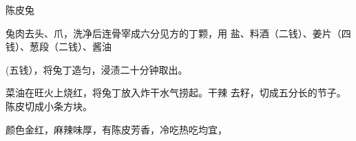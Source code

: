 \begin{recipe}{陈皮兔}

\ingredients


\cooking

\step 兔肉去头、爪，洗净后连骨宰成六分见方的丁颗，用 盐、料酒（二钱）、姜片（四钱）、葱段（二钱）、酱油

(五钱），将兔丁造匀，浸渍二十分钟取出。

\step 菜油在旺火上烧红，将兔丁放入炸干水气捞起。干辣 去籽，切成五分长的节子。陈皮切成小条方块。

\notes

颜色金红，麻辣味厚，有陈皮芳香，冷吃热吃均宜，

\end{recipe}

